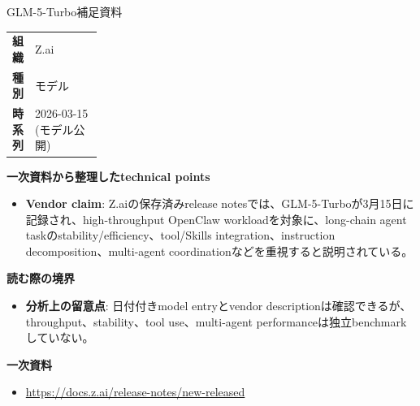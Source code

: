 \begin{technicalnote}{GLM-5-Turbo}{補足資料}
\begingroup
\begin{tabularx}{\linewidth}{@{}>{\bfseries}p{0.22\linewidth}X@{}}
組織 & Z.ai \\
種別 & モデル \\
時系列 & 2026-03-15 (モデル公開) \\
\end{tabularx}
\smallskip
{\bfseries 一次資料から整理したtechnical points}
\begin{itemize}[leftmargin=1.5em,itemsep=0.35em]
\item \textbf{Vendor claim}: Z.aiの保存済みrelease notesでは、GLM-5-Turboが3月15日に記録され、high-throughput OpenClaw workloadを対象に、long-chain agent taskのstability/efficiency、tool/Skills integration、instruction decomposition、multi-agent coordinationなどを重視すると説明されている。
\end{itemize}
\begin{minipage}{\linewidth}
{\bfseries 読む際の境界}
\begin{itemize}[leftmargin=1.5em,itemsep=0.35em]
\item \textbf{分析上の留意点}: 日付付きmodel entryとvendor descriptionは確認できるが、throughput、stability、tool use、multi-agent performanceは独立benchmarkしていない。
\end{itemize}
\begin{samepage}
{\bfseries 一次資料}
\begingroup\sloppy
\begin{itemize}[leftmargin=1.5em,itemsep=0.25em]
\item {\scriptsize\url{https://docs.z.ai/release-notes/new-released}}
\end{itemize}
\endgroup
\end{samepage}
\end{minipage}
\endgroup
\end{technicalnote}
\medskip


